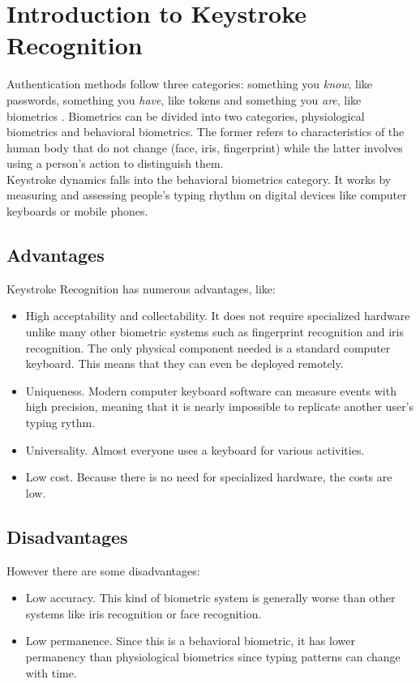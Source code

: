 \section{Introduction to Keystroke Recognition}
Authentication methods follow three categories: something you \textit{know}, like passwords, something you \textit{have}, like tokens and something you \textit{are}, like biometrics \cite{ref:glasgow intro}. Biometrics can be divided into two categories, physiological biometrics and behavioral biometrics. The former refers to characteristics of the human body that do not change (face, iris, fingerprint) while the latter involves using a person's action to distinguish them.\\

Keystroke dynamics falls into the behavioral biometrics category. It works by measuring and assessing people’s typing rhythm on digital devices like computer keyboards or mobile phones\cite{ref:survey intro}.\\

\subsection{Advantages}
Keystroke Recognition has numerous advantages, like:
\begin{itemize}
    \item High acceptability and collectability. It does not require specialized hardware unlike many other biometric systems such as fingerprint recognition and iris recognition. The only physical component needed is a standard computer keyboard. This means that they can even be deployed remotely.
    \item Uniqueness. Modern computer keyboard software can measure events with high precision, meaning that it is nearly impossible to replicate another user's typing rythm.
    \item Universality. Almost everyone uses a keyboard for various activities.
    \item Low cost. Because there is no need for specialized hardware, the costs are low.
\end{itemize}

\subsection{Disadvantages}
However there are some disadvantages:
\begin{itemize}
    \item Low accuracy. This kind of biometric system is generally worse than other systems like iris recognition or face recognition.
    \item Low permanence. Since this is a behavioral biometric, it has lower permanency than physiological biometrics since typing patterns can change with time.
\end{itemize}

